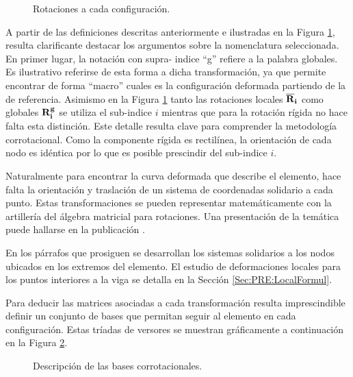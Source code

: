\begin{figure}[htbp]
	\centering
	\def\svgwidth{100mm}
	
	\caption{Rotaciones a cada configuración.}
	\label{fig:PRE:IlusCorrotRot}
\end{figure}

A partir de las definiciones descritas anteriormente e ilustradas en la Figura \ref{fig:PRE:IlusCorrotRot}, resulta clarificante destacar los argumentos sobre la nomenclatura seleccionada. En primer lugar, la notación con supra- indice ``g'' refiere a la palabra globales. Es ilustrativo referirse de esta forma a dicha transformación, ya que permite encontrar de forma ``macro'' cuales es la configuración deformada partiendo de la de referencia. Asimismo en la Figura \ref{fig:PRE:IlusCorrotRot} tanto las rotaciones locales $\bf{\overline{R}}_i$ como globales $\bf{R}_i^g$ se utiliza el sub-indice $i$ mientras que para la rotación rígida no hace falta esta distinción. Este detalle resulta clave para comprender la metodología corrotacional. Como la componente rígida es rectilínea, la orientación de cada nodo es idéntica por lo que es posible prescindir del sub-indice $i$.

Naturalmente para encontrar la curva deformada que describe el elemento, hace falta la orientación y traslación de un sistema de coordenadas solidario a cada punto. Estas transformaciones se pueden representar matemáticamente con la artillería del álgebra matricial para rotaciones. Una presentación de la temática puede hallarse en la publicación \citep{kovzar1995finite}.

En los párrafos que prosiguen se desarrollan los sistemas solidarios a los nodos ubicados en los extremos del elemento. El estudio de deformaciones locales para los puntos interiores a la viga se detalla en la Sección \ref{Sec:PRE:LocalFormul}.

Para deducir las matrices asociadas a cada transformación resulta imprescindible definir un conjunto de bases que permitan seguir al elemento en cada configuración. Estas tríadas de versores se muestran gráficamente a continuación en la Figura \ref{fig:PRE:IlusCorrot}.

\begin{figure}[htbp]
	\centering
	\def\svgwidth{100mm}
	
	\caption{Descripción de las bases corrotacionales.}
	\label{fig:PRE:IlusCorrot}
\end{figure}


